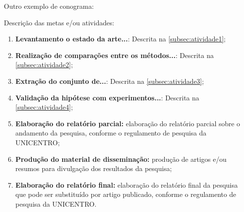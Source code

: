 Outro exemplo de conograma:



Descrição das metas e/ou atividades:
\begin{enumerate}
    \item \textbf{Levantamento o estado da arte...}: Descrita na \autoref{subsec:atividade1};
    \item \textbf{Realização de comparações entre os métodos...}: Descrita na \autoref{subsec:atividade2};
    \item \textbf{Extração do conjunto de...}: Descrita na \autoref{subsec:atividade3};    
    \item \textbf{Validação da hipótese com experimentos...}: Descrita na \autoref{subsec:atividade4};
    \item \textbf{Elaboração do relatório parcial:} elaboração do relatório parcial sobre o andamento da pesquisa, conforme o regulamento de pesquisa da UNICENTRO;
    \item \textbf{Produção do material de disseminação:} produção de artigos e/ou resumos para divulgação dos resultados da pesquisa;
    \item \textbf{Elaboração do relatório final:} elaboração do relatório final da pesquisa que pode ser substituído por artigo publicado, conforme o regulamento de pesquisa da UNICENTRO.
\end{enumerate}